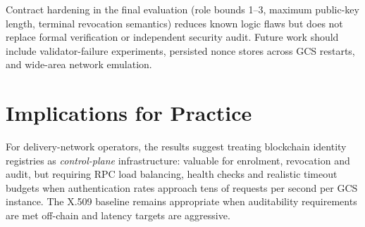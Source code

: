 Contract hardening in the final evaluation (role bounds 1--3, maximum public-key length, terminal revocation semantics) reduces known logic flaws but does not replace formal verification or independent security audit. Future work should include validator-failure experiments, persisted nonce stores across GCS restarts, and wide-area network emulation.

\section{Implications for Practice}
\label{sec:disc-practice}

For delivery-network operators, the results suggest treating blockchain identity registries as \emph{control-plane} infrastructure: valuable for enrolment, revocation and audit, but requiring RPC load balancing, health checks and realistic timeout budgets when authentication rates approach tens of requests per second per GCS instance. The X.509 baseline remains appropriate when auditability requirements are met off-chain and latency targets are aggressive.
